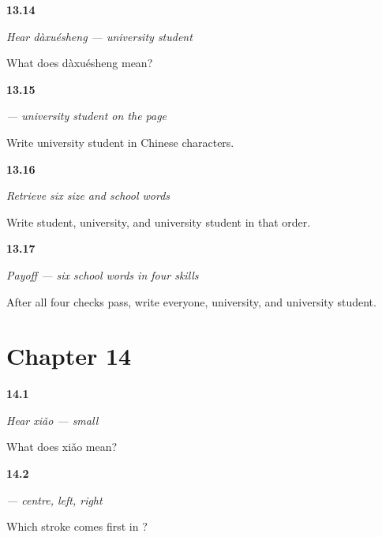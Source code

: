 \noindent\begin{minipage}[t]{\linewidth}
\raggedright
\hypertarget{review-ZH-C13-hear-daxuesheng-meaning}{\textbf{13.14}} \emph{Hear \emph{dàxuésheng} — university student}\par
\small What does dàxuésheng mean?
\end{minipage}\par\medskip

\noindent\begin{minipage}[t]{\linewidth}
\raggedright
\hypertarget{review-ZH-C13-daxuesheng-write}{\textbf{13.15}} \emph{ — university student on the page}\par
\small Write university student in Chinese characters.
\end{minipage}\par\medskip

\noindent\begin{minipage}[t]{\linewidth}
\raggedright
\hypertarget{review-ZH-R13-school-six-recall}{\textbf{13.16}} \emph{Retrieve six size and school words}\par
\small Write student, university, and university student in that order.
\end{minipage}\par\medskip

\noindent\begin{minipage}[t]{\linewidth}
\raggedright
\hypertarget{review-ZH-C13-practice-school-payoff}{\textbf{13.17}} \emph{Payoff — six school words in four skills}\par
\small After all four checks pass, write everyone, university, and university student.
\end{minipage}\par\medskip

\section*{Chapter 14}

\noindent\begin{minipage}[t]{\linewidth}
\raggedright
\hypertarget{review-ZH-C14-hear-xiao-meaning}{\textbf{14.1}} \emph{Hear \emph{xiǎo} — small}\par
\small What does xiǎo mean?
\end{minipage}\par\medskip

\noindent\begin{minipage}[t]{\linewidth}
\raggedright
\hypertarget{review-ZH-W14-xiao-order}{\textbf{14.2}} \emph{ — centre, left, right}\par
\small Which stroke comes first in ?
\end{minipage}\par\medskip

